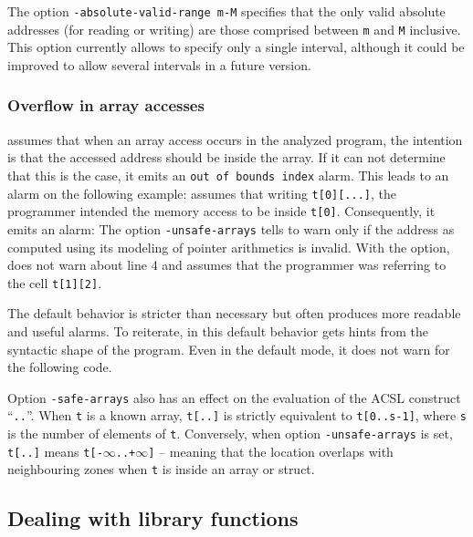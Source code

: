 \documentclass{frama-c-book}
\begin{document}
The option \lstinline|-absolute-valid-range m-M|
specifies that the only valid absolute addresses (for reading or writing)
are those comprised between \lstinline$m$ and \lstinline$M$ inclusive.
This option currently allows to specify only a single interval,
although it could be improved to allow several intervals
in a future version.


\subsubsection{Overflow in array accesses}
\label{unsafe-arrays}

\Eva{} assumes that when an array
access occurs in the analyzed program, the intention is that the
accessed address should be inside the array. If it can not determine that
this is the case, it emits an \lstinline|out of bounds index|
alarm. This leads to an alarm on the following example:
\Eva{} assumes that writing \lstinline|t[0][...]|, the programmer
intended the memory access to be inside \lstinline|t[0]|. Consequently,
it emits an alarm:
The option \lstinline|-unsafe-arrays| tells \Eva{} to warn
only if the address as computed using its modeling of pointer arithmetics
is invalid. With the option, \Eva{} does not warn about line 4
and assumes that the programmer
was referring to the cell \lstinline|t[1][2]|.

The default behavior is stricter than necessary but often produces more
readable and useful alarms. To reiterate, in this default behavior
\Eva{} gets hints from the syntactic shape of the program.
Even in the default mode, it does not warn for the following code.
\begin{listing}{4}
  int *p=&t[0][12];
  return *p;
}
\end{listing}

Option \lstinline|-safe-arrays| also has an effect on the evaluation
of the ACSL construct ``\lstinline|..|''. When \lstinline|t| is a
known array, \lstinline|t[..]| is strictly equivalent to
\lstinline|t[0..s-1]|, where \lstinline|s| is the number of elements
of \lstinline|t|. Conversely, when option \lstinline|-unsafe-arrays| is
set, \lstinline|t[..]| means
\lstinline|t[-|$\infty$\lstinline|..+|$\infty$\lstinline|]| -- meaning
that the location overlaps with neighbouring zones when \lstinline|t| is
inside an array or struct.

\subsection{Dealing with library functions}
\end{document}
